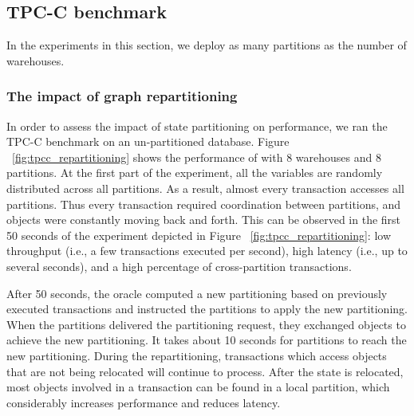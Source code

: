 
\subsection{TPC-C benchmark}
\label{sec:dynastar-evaluation:tpc-c}

In the experiments in this section, we deploy as many partitions as the number of warehouses.

\subsubsection{The impact of graph repartitioning}
In order to assess the impact of state partitioning on performance, we ran the TPC-C benchmark on an
un-partitioned database.  Figure ~\ref{fig:tpcc_repartitioning}
shows the performance of \dynastar with 8 warehouses and 8 partitions.
At the first part of the experiment, all the variables are randomly distributed across all partitions.
As a result, almost every transaction accesses all partitions. Thus every transaction
required coordination between partitions, and objects were constantly moving back and forth.
This can be observed in the first 50 seconds of the experiment depicted in Figure
~\ref{fig:tpcc_repartitioning}: low throughput (i.e., a few transactions executed per second),
high latency (i.e., up to several seconds), and a high percentage of cross-partition transactions.



After 50 seconds, the oracle computed a new partitioning based on previously executed transactions
and instructed the partitions to apply the new partitioning.
When the partitions delivered the partitioning request, they exchanged objects to achieve the new partitioning.
It takes about 10 seconds for partitions to reach the new partitioning.
During the repartitioning, transactions which access objects that are not being relocated will continue to process.
After the state is relocated, most objects involved in a transaction
can be found in a local partition, which considerably increases performance and reduces latency.

